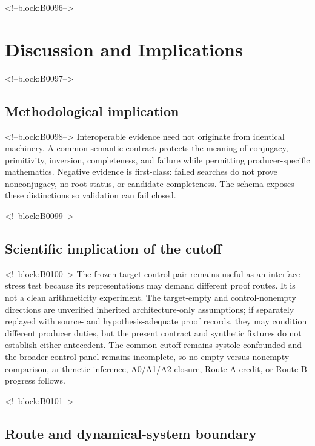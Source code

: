 \documentclass[11pt,a4paper]{article}
\begin{document}
<!--block:B0096-->
\hypertarget{discussion-and-implications}{%
\section{Discussion and Implications}\label{discussion-and-implications}}

<!--block:B0097-->
\hypertarget{methodological-implication}{%
\subsection{Methodological implication}\label{methodological-implication}}

<!--block:B0098-->
Interoperable evidence need not originate from identical machinery. A common semantic contract protects the meaning of conjugacy, primitivity, inversion, completeness, and failure while permitting producer-specific mathematics. Negative evidence is first-class: failed searches do not prove nonconjugacy, no-root status, or candidate completeness. The schema exposes these distinctions so validation can fail closed.

<!--block:B0099-->
\hypertarget{scientific-implication-of-the-cutoff}{%
\subsection{Scientific implication of the cutoff}\label{scientific-implication-of-the-cutoff}}

<!--block:B0100-->
The frozen target-control pair remains useful as an interface stress test because its representations may demand different proof routes. It is not a clean arithmeticity experiment. The target-empty and control-nonempty directions are unverified inherited architecture-only assumptions; if separately replayed with source- and hypothesis-adequate proof records, they may condition different producer duties, but the present contract and synthetic fixtures do not establish either antecedent. The common cutoff remains systole-confounded and the broader control panel remains incomplete, so no empty-versus-nonempty comparison, arithmetic inference, A0/A1/A2 closure, Route-A credit, or Route-B progress follows.

<!--block:B0101-->
\hypertarget{route-and-dynamical-system-boundary}{%
\subsection{Route and dynamical-system boundary}\label{route-and-dynamical-system-boundary}}
\end{document}
